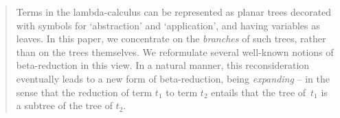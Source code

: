 \documentclass[submission,copyright,creativecommons]{eptcs}
\begin{document}






\theoremstyle{plain}
\newtheorem{The}{Theorem}[section]
\newtheorem{Ste}[The]{Theorem}
\newtheorem{Cor}[The]{Corollary}
\newtheorem{Lem}[The]{Lemma}
\newtheorem{Not}[The]{Notation}
\newtheorem{Rem}[The]{Remark}
\newtheorem{Rems}[The]{Remarks}
\newtheorem{For}[The]{Formula}
\newtheorem{Rul}[The]{Rule}
\newtheorem{Con}[The]{Convention}
\newtheorem{Note}[The]{Note}
\newtheorem{Exp}[The]{Explanation}


\theoremstyle{definition}
\newtheorem{Def}[The]{Definition}
\newtheorem{Exa}[The]{Example}
\newtheorem{Exas}[The]{Examples}
\newtheorem{Proc}[The]{Procedure}






\begin{abstract}
Terms in the lambda-calculus can be represented as planar trees decorated with symbols for `abstraction' and `application', and having variables as leaves. In this paper, we concentrate on the {\em branches\/} of such trees, rather than on the trees themselves. We reformulate several well-known notions of beta-reduction in this view. In a natural manner, this reconsideration eventually leads to a new form of beta-reduction, being {\em expanding\/} -- in the sense that the reduction of term $t_1$ to term $t_2$ entails that the tree of~$t_1$ is a subtree of the tree of $t_2$.
\end{abstract}






\end{document}
